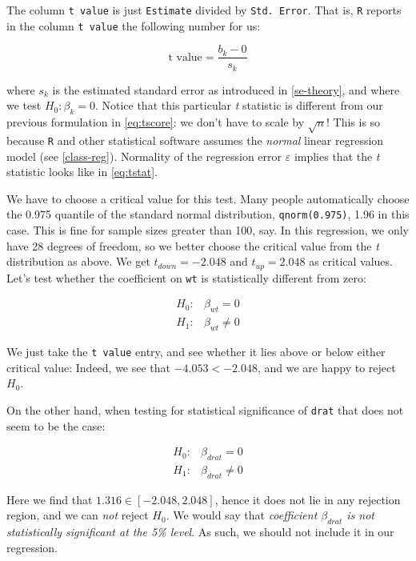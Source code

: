 \documentclass[]{book}
\begin{document}
The column \texttt{t\ value} is just \texttt{Estimate} divided by
\texttt{Std.\ Error}. That is, \texttt{R} reports in the column
\texttt{t\ value} the following number for us:

\begin{equation}
\text{t value} = \frac{b_k-0}{s_k}  \label{eq:tstat}
\end{equation}

where \(s_k\) is the estimated standard error as introduced in
\ref{se-theory}, and where we test \(H_0:\beta_k = 0\). Notice that this
particular \emph{t} statistic is different from our previous formulation
in \eqref{eq:tscore}: we don't have to scale by \(\sqrt{n}\)! This is so
because \texttt{R} and other statistical software assumes the
\emph{normal} linear regression model (see \ref{class-reg}). Normality
of the regression error \(\varepsilon\) implies that the \emph{t}
statistic looks like in \eqref{eq:tstat}.

We have to choose a critical value for this test. Many people
automatically choose the 0.975 quantile of the standard normal
distribution, \texttt{qnorm(0.975)}, 1.96 in this case. This is fine for
sample sizes greater than 100, say. In this regression, we only have 28
degrees of freedom, so we better choose the critical value from the
\emph{t} distribution as above. We get \(t_{down} = -2.048\) and
\(t_{up} = 2.048\) as critical values. Let's test whether the
coefficient on \texttt{wt} is statistically different from zero:

\begin{align}
H_0:& \beta_{wt} = 0\\
H_1:& \beta_{wt} \neq 0 \label{eq:mtcarswt}
\end{align}

We just take the \texttt{t\ value} entry, and see whether it lies above
or below either critical value: Indeed, we see that \(-4.053 < -2.048\),
and we are happy to reject \(H_0\).

On the other hand, when testing for statistical significance of
\texttt{drat} that does not seem to be the case:

\begin{align}
H_0:& \beta_{drat} = 0\\
H_1:& \beta_{drat} \neq 0 \label{eq:mtcarsdrat}
\end{align}

Here we find that \(1.316 \in [-2.048,2.048]\), hence it does not lie in
any rejection region, and we can \emph{not} reject \(H_0\). We would say
that \emph{coefficient \(\beta_{drat}\) is not statistically significant
at the 5\% level}. As such, we should not include it in our regression.
\end{document}

